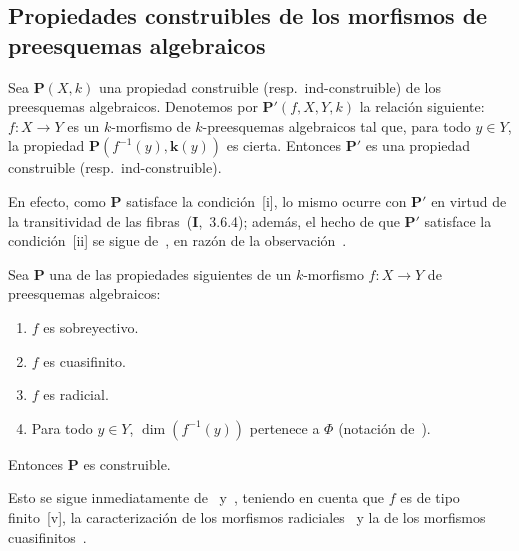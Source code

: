 \subsection{Propiedades construibles de los morfismos de preesquemas algebraicos}
\label{subsection:IV.9.3}

\begin{proposition}[9.3.1]
\label{IV.9.3.1}
Sea $\boldsymbol{P}(X,k)$ una propiedad construible \textnormal{(resp.}\ ind-construible\textnormal{)} de los preesquemas algebraicos.
Denotemos por $\boldsymbol{P}'(f,X,Y,k)$ la relación siguiente: $f:X\to Y$ es un $k$-morfismo de $k$-preesquemas algebraicos tal que, para todo $y\in Y$, la propiedad $\boldsymbol{P}(f^{-1}(y),\boldsymbol{k}(y))$ es cierta.
Entonces $\boldsymbol{P}'$ es una propiedad construible \textnormal{(resp.}\ ind-construible\textnormal{)}.
\end{proposition}

En efecto, como $\boldsymbol{P}$ satisface la condición~[i], lo mismo ocurre con $\boldsymbol{P}'$ en virtud de la transitividad de las fibras~(\textbf{I},~3.6.4); además, el hecho de que $\boldsymbol{P}'$ satisface la condición~[ii] se sigue de~, en razón de la observación~.

\begin{proposition}[9.3.2]
\label{IV.9.3.2}
Sea $\boldsymbol{P}$ una de las propiedades siguientes de un $k$-morfismo $f:X\to Y$ de preesquemas algebraicos:
\begin{enumerate}[label=\textup{(\roman*)}]
  \item $f$ es sobreyectivo.
  \item $f$ es cuasifinito.
  \item $f$ es radicial.
  \item Para todo $y\in Y$, $\dim(f^{-1}(y))$ pertenece a $\Phi$ \textnormal{(}notación de~\textnormal{)}.
\end{enumerate}
Entonces $\boldsymbol{P}$ es construible.
\end{proposition}

Esto se sigue inmediatamente de~ y~, teniendo en cuenta que $f$ es de tipo finito~[v], la caracterización de los morfismos radiciales~ y la de los morfismos cuasifinitos~.

